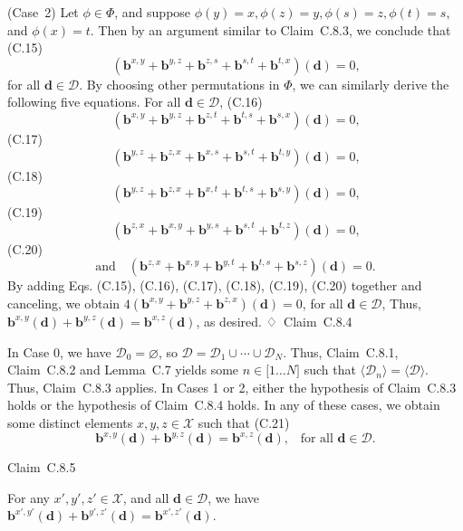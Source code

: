 \documentclass[
]{article}
\begin{document}
(Case~2) Let \(\phi \in \Phi\), and suppose
\(\phi(y) = x,\phi(z) = y,\phi(s) = z,\phi(t) = s\), and
\(\phi(x) = t\). Then by an argument similar to Claim~C.8.3, we conclude
that
(C.15)\[\left( \mathbf{b}^{x,y} + \mathbf{b}^{y,z} + \mathbf{b}^{z,s} + \mathbf{b}^{s,t} + \mathbf{b}^{t,x} \right)\left( \mathbf{d} \right) = 0\text{,}\]
for all \(\mathbf{d} \in \mathcal{D}\). By choosing other permutations
in \(\Phi\), we can similarly derive the following five equations. For
all \(\mathbf{d} \in \mathcal{D}\),
(C.16)\[\left( \mathbf{b}^{x,y} + \mathbf{b}^{y,z} + \mathbf{b}^{z,t} + \mathbf{b}^{t,s} + \mathbf{b}^{s,x} \right)\left( \mathbf{d} \right) = 0\text{,}\](C.17)\[\left( \mathbf{b}^{y,z} + \mathbf{b}^{z,x} + \mathbf{b}^{x,s} + \mathbf{b}^{s,t} + \mathbf{b}^{t,y} \right)\left( \mathbf{d} \right) = 0\text{,}\](C.18)\[\left( \mathbf{b}^{y,z} + \mathbf{b}^{z,x} + \mathbf{b}^{x,t} + \mathbf{b}^{t,s} + \mathbf{b}^{s,y} \right)\left( \mathbf{d} \right) = 0\text{,}\](C.19)\[\left( \mathbf{b}^{z,x} + \mathbf{b}^{x,y} + \mathbf{b}^{y,s} + \mathbf{b}^{s,t} + \mathbf{b}^{t,z} \right)\left( \mathbf{d} \right) = 0\text{,}\](C.20)\[\text{and}\quad\left( \mathbf{b}^{z,x} + \mathbf{b}^{x,y} + \mathbf{b}^{y,t} + \mathbf{b}^{t,s} + \mathbf{b}^{s,z} \right)\left( \mathbf{d} \right) = 0\text{.}\]
By adding Eqs. (C.15), (C.16), (C.17), (C.18), (C.19), (C.20) together
and canceling, we obtain
\(4\left( \mathbf{b}^{x,y} + \mathbf{b}^{y,z} + \mathbf{b}^{z,x} \right)\left( \mathbf{d} \right) = 0\),
for all \(\mathbf{d} \in \mathcal{D}\), Thus,
\(\mathbf{b}^{x,y}\left( \mathbf{d} \right) + \mathbf{b}^{y,z}\left( \mathbf{d} \right) = \mathbf{b}^{x,z}\left( \mathbf{d} \right)\),
as desired. ♢~Claim~C.8.4

In Case 0, we have \(\mathcal{D}_{0} = \varnothing\), so
\(\mathcal{D} = \mathcal{D}_{1} \cup \cdots \cup \mathcal{D}_{N}\).
Thus, Claim~C.8.1, Claim~C.8.2 and Lemma~C.7 yields some
\(n \in \lbrack 1\ldots N\rbrack\) such that
\({\langle\mathcal{D}_{n}\rangle} = {\langle\mathcal{D}\rangle}\). Thus,
Claim~C.8.3 applies. In Cases 1 or 2, either the hypothesis of
Claim~C.8.3 holds or the hypothesis of Claim~C.8.4 holds. In any of
these cases, we obtain some distinct elements \(x,y,z \in \mathcal{X}\)
such that
(C.21)\[\mathbf{b}^{x,y}\left( \mathbf{d} \right) + \mathbf{b}^{y,z}\left( \mathbf{d} \right) = \mathbf{b}^{x,z}\left( \mathbf{d} \right)\text{,}\quad\text{for~all~}\mathbf{d} \in \mathcal{D}\text{.}\]

Claim~C.8.5

For any \(x',y',z' \in \mathcal{X}\), and all
\(\mathbf{d} \in \mathcal{D}\), we have
\(\mathbf{b}^{x',y'}\left( \mathbf{d} \right) + \mathbf{b}^{y',z'}\left( \mathbf{d} \right) = \mathbf{b}^{x',z'}\left( \mathbf{d} \right)\).
\end{document}
